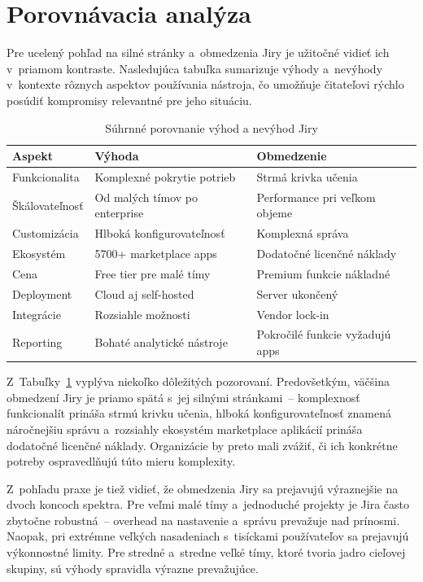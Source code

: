\section{Porovnávacia analýza}

Pre ucelený pohľad na silné stránky a~obmedzenia Jiry je užitočné vidieť ich v~priamom kontraste. Nasledujúca tabuľka sumarizuje výhody a~nevýhody v~kontexte rôznych aspektov používania nástroja, čo umožňuje čitateľovi rýchlo posúdiť kompromisy relevantné pre jeho situáciu.

\begin{table}[ht]
\centering
\caption{Súhrnné porovnanie výhod a nevýhod Jiry}
\label{tab:porovnanie-vyhod}
\begin{tabular}{|p{4cm}|p{4.5cm}|p{4.5cm}|}
\hline
\textbf{Aspekt} & \textbf{Výhoda} & \textbf{Obmedzenie} \\
\hline
Funkcionalita & Komplexné pokrytie potrieb & Strmá krivka učenia \\
\hline
Škálovateľnosť & Od malých tímov po enterprise & Performance pri veľkom objeme \\
\hline
Customizácia & Hlboká konfigurovateľnosť & Komplexná správa \\
\hline
Ekosystém & 5700+ marketplace apps & Dodatočné licenčné náklady \\
\hline
Cena & Free tier pre malé tímy & Premium funkcie nákladné \\
\hline
Deployment & Cloud aj self-hosted & Server ukončený \\
\hline
Integrácie & Rozsiahle možnosti & Vendor lock-in \\
\hline
Reporting & Bohaté analytické nástroje & Pokročilé funkcie vyžadujú apps \\
\hline
\end{tabular}
\end{table}

Z~Tabuľky~\ref{tab:porovnanie-vyhod} vyplýva niekoľko dôležitých pozorovaní. Predovšetkým, väčšina obmedzení Jiry je priamo spätá s~jej silnými stránkami~-- komplexnosť funkcionalít prináša strmú krivku učenia, hlboká konfigurovateľnosť znamená náročnejšiu správu a~rozsiahly ekosystém marketplace aplikácií prináša dodatočné licenčné náklady. Organizácie by preto mali zvážiť, či ich konkrétne potreby ospravedlňujú túto mieru komplexity.

Z~pohľadu praxe je tiež vidieť, že obmedzenia Jiry sa prejavujú výraznejšie na dvoch koncoch spektra. Pre veľmi malé tímy a~jednoduché projekty je Jira často zbytočne robustná~-- overhead na nastavenie a~správu prevažuje nad prínosmi. Naopak, pri extrémne veľkých nasadeniach s~tisíckami používateľov sa prejavujú výkonnostné limity. Pre stredné a~stredne veľké tímy, ktoré tvoria jadro cieľovej skupiny, sú výhody spravidla výrazne prevažujúce.

